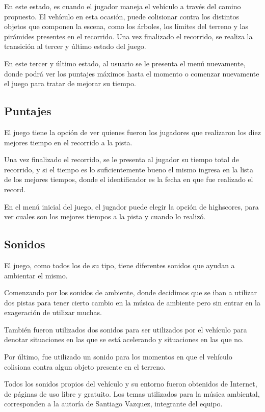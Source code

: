 \documentclass[a4paper,10pt]{article}
\begin{document}
En este estado, es cuando el jugador maneja el veh\'iculo a trav\'es del camino
propuesto.  El veh\'iculo en esta ocasi\'on, puede colisionar contra los
distintos
objetos que componen la escena, como los \'arboles, los l\'imites del terreno y
las
pir\'amides presentes en el recorrido.  Una vez finalizado el recorrido, se
realiza la transici\'on al tercer y \'ultimo estado del juego.

En este tercer y \'ultimo estado, al usuario se le presenta el men\'u
nuevamente,
donde podr\'a ver los puntajes m\'aximos hasta el momento o comenzar nuevamente
el
juego para tratar de mejorar su tiempo.

\subsection{Puntajes}
El juego tiene la opci\'on de ver quienes fueron los jugadores que realizaron
los
diez mejores tiempo en el recorrido a la pista.

Una vez finalizado el recorrido, se le presenta al jugador su tiempo total
de
recorrido, y si el tiempo es lo suficientemente bueno el mismo ingresa en la
lista de los mejores tiempos, donde el identificador es la fecha en que fue
realizado el record.

En el men\'u inicial del juego, el jugador puede elegir la opci\'on de
highscores,
para ver cuales son los mejores tiempos a la pista y cuando lo realiz\'o.


\subsection{Sonidos}
El juego, como todos los de su tipo, tiene diferentes sonidos que ayudan a
ambientar el mismo.

Comenzando por los sonidos de ambiente, donde decidimos que se iban a
utilizar
dos pistas para tener cierto cambio en la m\'usica de ambiente pero sin entrar
en
la exageraci\'on de utilizar muchas.

Tambi\'en fueron utilizados dos sonidos para ser utilizados por el veh\'iculo
para
denotar situaciones en las que se est\'a acelerando y situaciones en las que no.

Por \'ultimo, fue utilizado un sonido para los momentos en que el veh\'iculo
colisiona contra algun objeto presente en el terreno.

Todos los sonidos propios del veh\'iculo y su entorno fueron obtenidos de
Internet, de p\'aginas de uso libre y gratuito.  Los temas utilizados para la
m\'usica ambiental, corresponden a la autor\'ia de Santiago Vazquez, integrante
del
equipo.
\end{document}
